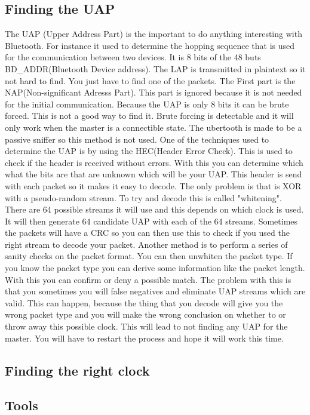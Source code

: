 \subsection{Finding the UAP}

The UAP (Upper Address Part) is the important to do anything interesting with Bluetooth. For instance it used to determine the hopping sequence that is used for the communication between two devices. It is 8 bits of the 48 buts BD_ADDR(Bluetooth Device address). The LAP is transmitted in plaintext so it not hard to find. You just have to find one of the packets. The First part is the NAP(Non-significant Adresss Part). This part is ignored because it is not needed for the initial communication. Because the UAP is only 8 bits it can be brute forced. This is not a good way to find it. Brute forcing is detectable and it will only work when the master is a connectible state. 
The ubertooth is made to be a passive sniffer so this method is not used. One of the techniques used to determine the UAP is by using the HEC(Header Error Check). This is used to check if the header is received without errors. With this you can determine which what the bits are that are unknown which will be your UAP. This header is send with each packet so it makes it easy to decode. The only problem is that is XOR with a pseudo-random stream. To try and decode this is called "whitening". There are 64 possible streams it will use and this depends on which clock is used. It will then generate 64 candidate UAP with each of the 64 streams. Sometimes the packets will have a CRC so you can then use this to check if you used the right stream to decode your packet.
Another method is to perform a series of sanity checks on the packet format. You can then unwhiten the packet type. If you know the packet type you can derive some information like the packet length. With this you can confirm or deny a possible match. The problem with this is that you sometimes you will false negatives and eliminate UAP streams which are valid. This can happen, because the thing that you decode will give you the wrong packet type and you will make the wrong conclusion on whether to or throw away this possible clock. This will lead to not finding any UAP for the master. You will have to restart the process and hope it will work this time.

\subsection{Finding the right clock}

\subsection{Tools}